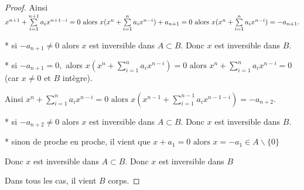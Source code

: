 \begin{proof}
	Ainsi $x^{n+1}+\sum\limits_{i=1}^{n+1}a_{i}x^{n+1-i}=0\text{ alors } 
	x(x^{n}+\sum\limits_{i=1}^{n}a_{i}x^{n-i})+a_{n+1}=0\text{ alors } \\
	x(x^{n}+\sum\limits_{i=1}^{n}a_{i}x^{n-i})=-a_{n+1}.$
	
	* si $-a_{n+1}\neq 0$ alors $x$ est inversible dans $A\subset B.$ Donc $x$
	est inversible dans $B.$
	
	* si $-a_{n+1}=0,$ alors $x(x^{n}+\sum\limits_{i=1}^{n}a_{i}x^{n-i})=0 \text{ alors } x^{n}+\sum\limits_{i=1}^{n}a_{i}x^{n-i}=0$\\ (car $x\neq 0$ et $B$ intègre).
	
	Ainsi $x^{n}+\sum\limits_{i=1}^{n}a_{i}x^{n-i}=0\text{ alors }
	x(x^{n-1}+\sum\limits_{i=1}^{n-1}a_{i}x^{n-1-i})=-a_{n+2}.$
	
	* si $-a_{n+2}\neq 0$ alors $x$ est inversible dans $A\subset B.$ Donc $x$ est inversible dans $B.$
	
	* sinon de proche en proche, il vient que $x+a_{1}=0\text{ alors } x=-a_{1}\in
	A\backslash \{0\}$
	
	Donc $x$ est inversible dans $A\subset B.$ Donc $x$ est inversible dans $B$
	
	Dans tous les cas, il vient $B$ corps.
\end{proof}

